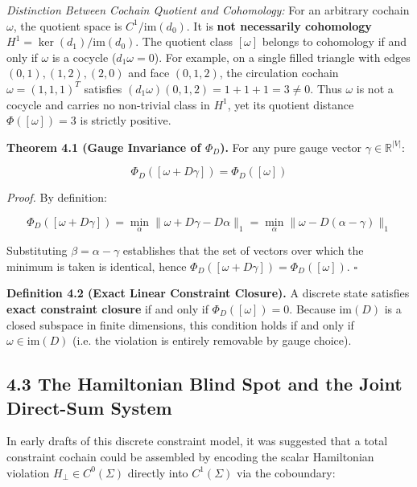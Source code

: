 \documentclass[11pt]{article}
\begin{document}
\emph{Distinction Between Cochain Quotient and Cohomology:} For an arbitrary cochain $\omega$, the quotient space is $C^1 / \mathrm{im}(d_0)$. It is \textbf{not necessarily cohomology} $H^1 = \ker(d_1) / \mathrm{im}(d_0)$. The quotient class $[\omega]$ belongs to cohomology if and only if $\omega$ is a cocycle ($d_1 \omega = 0$). For example, on a single filled triangle with edges $(0,1), (1,2), (2,0)$ and face $(0,1,2)$, the circulation cochain $\omega = (1, 1, 1)^T$ satisfies $(d_1 \omega)(0,1,2) = 1 + 1 + 1 = 3 \ne 0$. Thus $\omega$ is not a cocycle and carries no non-trivial class in $H^1$, yet its quotient distance $\Phi([\omega]) = 3$ is strictly positive.

\textbf{Theorem 4.1 (Gauge Invariance of $\Phi_D$).} For any pure gauge vector $\gamma \in \mathbb{R}^{|V|}$:

\begin{equation*}
\Phi_D([\omega + D \gamma]) = \Phi_D([\omega])
\end{equation*}

\emph{Proof.} By definition:

\begin{equation*}
\Phi_D([\omega + D \gamma]) = \min_{\alpha} \|\omega + D \gamma - D \alpha\|_1 = \min_{\alpha} \|\omega - D (\alpha - \gamma)\|_1
\end{equation*}

Substituting $\beta = \alpha - \gamma$ establishes that the set of vectors over which the minimum is taken is identical, hence $\Phi_D([\omega + D \gamma]) = \Phi_D([\omega])$. $\square$

\textbf{Definition 4.2 (Exact Linear Constraint Closure).} A discrete state satisfies \textbf{exact constraint closure} if and only if $\Phi_D([\omega]) = 0$. Because $\mathrm{im}(D)$ is a closed subspace in finite dimensions, this condition holds if and only if $\omega \in \mathrm{im}(D)$ (i.e. the violation is entirely removable by gauge choice).

\subsection{\texorpdfstring{4.3 The Hamiltonian Blind Spot and the Joint Direct-Sum System}{4.3 The Hamiltonian Blind Spot and the Joint Direct-Sum System}}

In early drafts of this discrete constraint model, it was suggested that a total constraint cochain could be assembled by encoding the scalar Hamiltonian violation $H_\perp \in C^0(\Sigma)$ directly into $C^1(\Sigma)$ via the coboundary:
\end{document}
